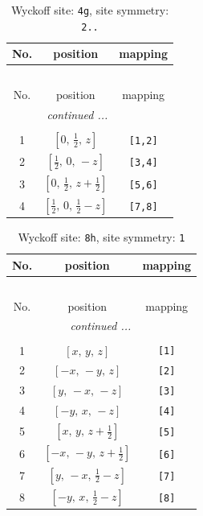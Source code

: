 \documentclass[fleqn,8pt]{jsarticle}
\begin{document}
\renewcommand{\arraystretch}{1.2}
\begin{longtable}{ccc}
\caption{Wyckoff site: {\tt 4g}, site symmetry: {\tt 2..}}
 \\
 \hline \hline
No. & position & mapping \\ \hline \endfirsthead

\multicolumn{2}{l}{\tablename\ \thetable{}} \\
 \hline \hline
No. & position & mapping \\ \hline \endhead

 \hline \hline
\multicolumn{2}{r}{\footnotesize\it continued ...} \\ \endfoot

 \hline \hline
\multicolumn{2}{r}{} \\ \endlastfoot

1 & $\left[ 0,\, \frac{1}{2},\, z \right]$ & {\tt [1,2]} \\ \hline
2 & $\left[ \frac{1}{2},\, 0,\, - z \right]$ & {\tt [3,4]} \\ \hline
3 & $\left[ 0,\, \frac{1}{2},\, z + \frac{1}{2} \right]$ & {\tt [5,6]} \\ \hline
4 & $\left[ \frac{1}{2},\, 0,\, \frac{1}{2} - z \right]$ & {\tt [7,8]} \\
\end{longtable}
\renewcommand{\arraystretch}{1.2}
\begin{longtable}{ccc}
\caption{Wyckoff site: {\tt 8h}, site symmetry: {\tt 1}}
 \\
 \hline \hline
No. & position & mapping \\ \hline \endfirsthead

\multicolumn{2}{l}{\tablename\ \thetable{}} \\
 \hline \hline
No. & position & mapping \\ \hline \endhead

 \hline \hline
\multicolumn{2}{r}{\footnotesize\it continued ...} \\ \endfoot

 \hline \hline
\multicolumn{2}{r}{} \\ \endlastfoot

1 & $\left[ x,\, y,\, z \right]$ & {\tt [1]} \\ \hline
2 & $\left[ - x,\, - y,\, z \right]$ & {\tt [2]} \\ \hline
3 & $\left[ y,\, - x,\, - z \right]$ & {\tt [3]} \\ \hline
4 & $\left[ - y,\, x,\, - z \right]$ & {\tt [4]} \\ \hline
5 & $\left[ x,\, y,\, z + \frac{1}{2} \right]$ & {\tt [5]} \\ \hline
6 & $\left[ - x,\, - y,\, z + \frac{1}{2} \right]$ & {\tt [6]} \\ \hline
7 & $\left[ y,\, - x,\, \frac{1}{2} - z \right]$ & {\tt [7]} \\ \hline
8 & $\left[ - y,\, x,\, \frac{1}{2} - z \right]$ & {\tt [8]} \\
\end{longtable}
\end{document}
